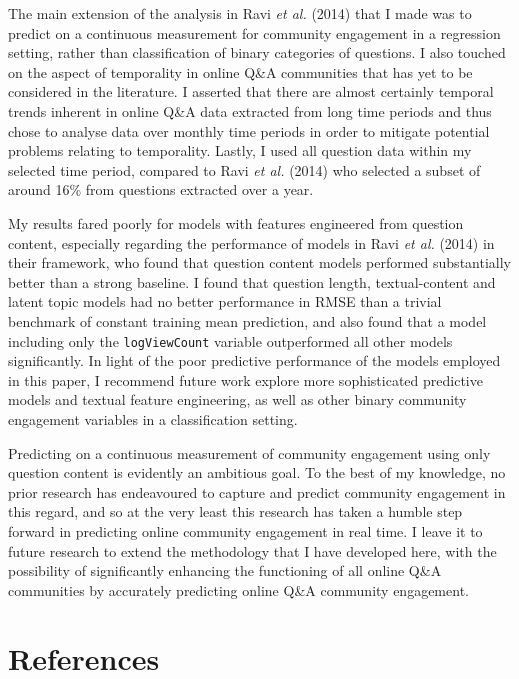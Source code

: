 \documentclass[11pt,preprint, authoryear]{article}
\begin{document}
The main extension of the analysis in Ravi \emph{et al.} (2014) that I
made was to predict on a continuous measurement for community engagement
in a regression setting, rather than classification of binary categories
of questions. I also touched on the aspect of temporality in online Q\&A
communities that has yet to be considered in the literature. I asserted
that there are almost certainly temporal trends inherent in online Q\&A
data extracted from long time periods and thus chose to analyse data
over monthly time periods in order to mitigate potential problems
relating to temporality. Lastly, I used all question data within my
selected time period, compared to Ravi \emph{et al.} (2014) who selected
a subset of around 16\% from questions extracted over a year.

My results fared poorly for models with features engineered from
question content, especially regarding the performance of models in Ravi
\emph{et al.} (2014) in their framework, who found that question content
models performed substantially better than a strong baseline. I found
that question length, textual-content and latent topic models had no
better performance in RMSE than a trivial benchmark of constant training
mean prediction, and also found that a model including only the
\texttt{logViewCount} variable outperformed all other models
significantly. In light of the poor predictive performance of the models
employed in this paper, I recommend future work explore more
sophisticated predictive models and textual feature engineering, as well
as other binary community engagement variables in a classification
setting.

Predicting on a continuous measurement of community engagement using
only question content is evidently an ambitious goal. To the best of my
knowledge, no prior research has endeavoured to capture and predict
community engagement in this regard, and so at the very least this
research has taken a humble step forward in predicting online community
engagement in real time. I leave it to future research to extend the
methodology that I have developed here, with the possibility of
significantly enhancing the functioning of all online Q\&A communities
by accurately predicting online Q\&A community engagement.

\newpage

\section*{References}\label{references}
\end{document}
